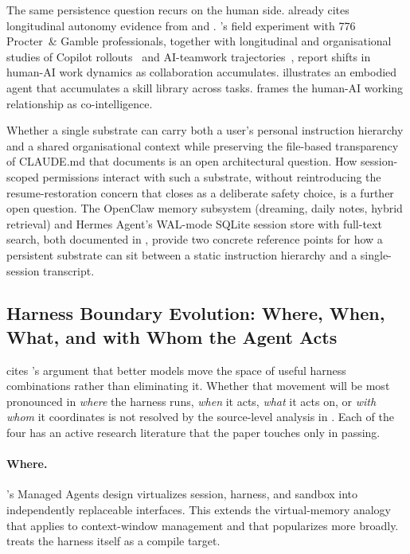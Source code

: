The same persistence question recurs on the human side.  already cites longitudinal autonomy evidence from \citet{anthropic2025internal} and \citet{anthropic2026autonomy}. \citet{dellacqua2025cybernetic}'s field experiment with 776 Procter~\& Gamble professionals, together with longitudinal and organisational studies of Copilot rollouts~\citep{stray2025copiloteval} and AI-teamwork trajectories~\citep{xiao2025aiteamwork}, report shifts in human-AI work dynamics as collaboration accumulates. \citet{wang2023voyager} illustrates an embodied agent that accumulates a skill library across tasks. \citet{mollick2024cointelligence} frames the human-AI working relationship as co-intelligence.

Whether a single substrate can carry both a user's personal instruction hierarchy and a shared organisational context while preserving the file-based transparency of CLAUDE.md that  documents is an open architectural question. How session-scoped permissions interact with such a substrate, without reintroducing the resume-restoration concern that  closes as a deliberate safety choice, is a further open question. The OpenClaw memory subsystem (dreaming, daily notes, hybrid retrieval) and Hermes Agent's WAL-mode SQLite session store with full-text search, both documented in , provide two concrete reference points for how a persistent substrate can sit between a static instruction hierarchy and a single-session transcript.

\subsection{Harness Boundary Evolution: Where, When, What, and with Whom the Agent Acts}
\label{sec:future:boundary}

 cites \citet{anthropic2026harness}'s argument that better models move the space of useful harness combinations rather than eliminating it. Whether that movement will be most pronounced in \emph{where} the harness runs, \emph{when} it acts, \emph{what} it acts on, or \emph{with whom} it coordinates is not resolved by the source-level analysis in . Each of the four has an active research literature that the paper touches only in passing.

\paragraph{Where.} \citet{anthropic2026managed}'s Managed Agents design virtualizes session, harness, and sandbox into independently replaceable interfaces. This extends the virtual-memory analogy that \citet{packer2024memgpt} applies to context-window management and that \citet{karpathy2023llmos} popularizes more broadly. \citet{khattab2024dspy} treats the harness itself as a compile target. 

